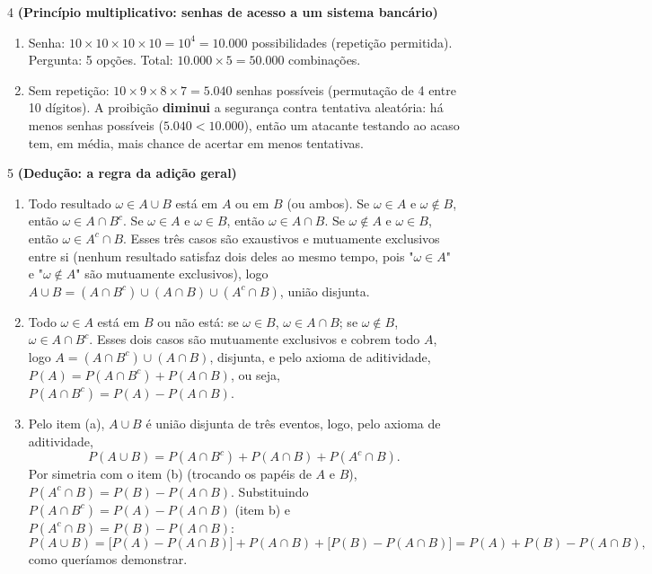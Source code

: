 \documentclass[11pt]{article}
\begin{document}
\begin{questao}{4} \textbf{(Princípio multiplicativo: senhas de acesso a um sistema bancário)}
\begin{solucao}
\begin{enumerate}[label=(\alph*)]
  \item Senha: $10\times10\times10\times10=10^4=10.000$ possibilidades (repetição permitida).
    Pergunta: 5 opções. Total: $10.000\times 5 = 50.000$ combinações.
  \item Sem repetição: $10\times 9\times 8\times 7 = 5.040$ senhas possíveis (permutação de 4 entre
    10 dígitos). A proibição \textbf{diminui} a segurança contra tentativa aleatória: há menos
    senhas possíveis ($5.040 < 10.000$), então um atacante testando ao acaso tem, em média, mais
    chance de acertar em menos tentativas.
\end{enumerate}
\end{solucao}
\end{questao}

\begin{questao}{5} \textbf{(Dedução: a regra da adição geral)}
\begin{solucao}
\begin{enumerate}[label=(\alph*)]
  \item Todo resultado $\omega\in A\cup B$ está em $A$ ou em $B$ (ou ambos). Se $\omega\in A$ e
    $\omega\notin B$, então $\omega\in A\cap B^c$. Se $\omega\in A$ e $\omega\in B$, então
    $\omega\in A\cap B$. Se $\omega\notin A$ e $\omega\in B$, então $\omega\in A^c\cap B$. Esses
    três casos são exaustivos e mutuamente exclusivos entre si (nenhum resultado satisfaz dois
    deles ao mesmo tempo, pois "$\omega\in A$" e "$\omega\notin A$" são mutuamente exclusivos), logo
    $A\cup B = (A\cap B^c)\cup(A\cap B)\cup(A^c\cap B)$, união disjunta.
  \item Todo $\omega\in A$ está em $B$ ou não está: se $\omega\in B$, $\omega\in A\cap B$; se
    $\omega\notin B$, $\omega\in A\cap B^c$. Esses dois casos são mutuamente exclusivos e cobrem
    todo $A$, logo $A=(A\cap B^c)\cup(A\cap B)$, disjunta, e pelo axioma de aditividade,
    $P(A)=P(A\cap B^c)+P(A\cap B)$, ou seja, $P(A\cap B^c) = P(A) - P(A\cap B)$.
  \item Pelo item (a), $A\cup B$ é união disjunta de três eventos, logo, pelo axioma de
    aditividade,
    $$
    P(A\cup B) = P(A\cap B^c) + P(A\cap B) + P(A^c\cap B).
    $$
    Por simetria com o item (b) (trocando os papéis de $A$ e $B$), $P(A^c\cap B) = P(B)-P(A\cap
    B)$. Substituindo $P(A\cap B^c)=P(A)-P(A\cap B)$ (item b) e $P(A^c\cap B)=P(B)-P(A\cap B)$:
    $$
    P(A\cup B) = \big[P(A)-P(A\cap B)\big] + P(A\cap B) + \big[P(B)-P(A\cap B)\big]
    = P(A)+P(B)-P(A\cap B),
    $$
    como queríamos demonstrar.
\end{enumerate}
\end{solucao}
\end{questao}
\end{document}
